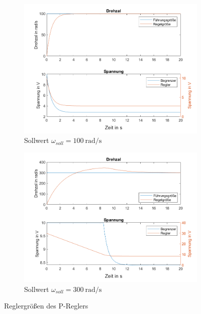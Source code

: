 \documentclass[
    paper=a4,
    fontsize=10pt,
    DIV=12,
    oneside,
]{scrartcl}
\begin{document}
    \begin{figure}[hbt]
        \centering
        \begin{subfigure}{0.49\columnwidth}
            \includegraphics[width=1.0\columnwidth]{../versuch3/graphPiController.png}
            \caption{Sollwert \(\omega_{soll} = \SI{100}{\radian\per\second}\)}
            \label{fig:graphPiController}   
        \end{subfigure}%
        \hfill%
        \begin{subfigure}{0.49\columnwidth}
            \includegraphics[width=1.0\columnwidth]{../versuch3/graphPiControllerNew.png}
            \caption{Sollwert \(\omega_{soll} = \SI{300}{\radian\per\second}\)}
            \label{fig:graphPiControllerNew}
        \end{subfigure}
        \caption{Reglergrößen des P-Reglers}
    \end{figure}
\end{document}

